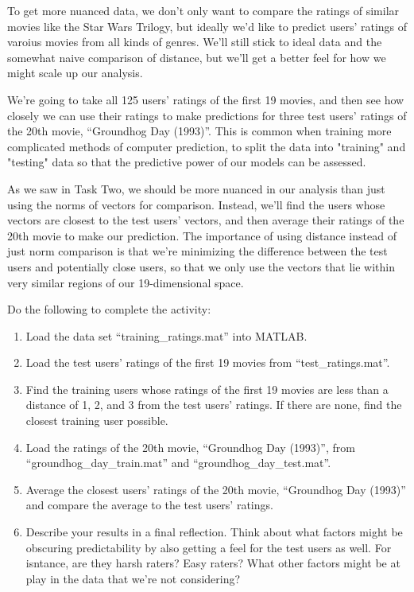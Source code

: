 \documentclass{ximera}
\begin{document}
  \begin{exploration}
  
    To get more nuanced data, we don't only want to compare the ratings of similar movies like the Star Wars Trilogy, but ideally we'd like to predict users' ratings of varoius movies from all kinds of genres. We'll still stick to ideal data and the somewhat naive comparison of distance, but we'll get a better feel for how we might scale up our analysis.

    We're going to take all 125 users' ratings of the first 19 movies, and then see how closely we can use their ratings to make predictions for three test users' ratings of the 20th movie, ``Groundhog Day (1993)''. This is common when training more complicated methods of computer prediction, to split the data into "training" and "testing" data so that the predictive power of our models can be assessed.

    As we saw in Task Two, we should be more nuanced in our analysis than just using the norms of vectors for comparison. Instead, we'll find the users whose vectors are closest to the test users' vectors, and then average their ratings of the 20th movie to make our prediction. The importance of using distance instead of just norm comparison is that we're minimizing the difference between the test users and potentially close users, so that we only use the vectors that lie within very similar regions of our 19-dimensional space.

    \begin{problem}

    Do the following to complete the activity:

    \begin{enumerate}

      \item Load the data set ``training\_ratings.mat'' into MATLAB.
      \item Load the test users' ratings of the first 19 movies from ``test\_ratings.mat''.
      \item Find the training users whose ratings of the first 19 movies are less than a distance of 1, 2, and 3 from the test users' ratings. If there are none, find the closest training user possible.
      \item Load the ratings of the 20th movie, ``Groundhog Day (1993)'', from ``groundhog\_day\_train.mat'' and ``groundhog\_day\_test.mat''.
      \item Average the closest users' ratings of the 20th movie, ``Groundhog Day (1993)'' and compare the average to the test users' ratings.
      \item Describe your results in a final reflection. Think about what factors might be obscuring predictability by also getting a feel for the test users as well. For isntance, are they harsh raters? Easy raters? What other factors might be at play in the data that we're not considering?
    \end{enumerate}


\end{problem}
\end{exploration}
\end{document}

